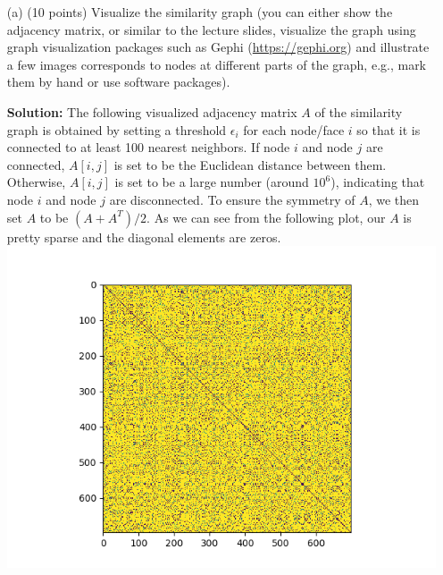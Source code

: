 \documentclass[twoside,12pt]{article}
\begin{document}
\begin{enumerate} 

\item[(a)] (10 points) Visualize the similarity graph (you can either show the adjacency matrix, or similar to the lecture slides, visualize the graph using graph visualization packages such as Gephi (\url{https://gephi.org}) and illustrate a few images corresponds to nodes at different parts of the graph, e.g., mark them by hand or use software packages).
\begin{tcolorbox}
\textbf{Solution:} The following visualized adjacency matrix $A$ of the similarity graph is obtained by setting a threshold $\epsilon_i$ for each node/face $i$ so that it is connected to at least 100 nearest neighbors. If node $i$ and node $j$ are connected, $A[i, j]$ is set to be the Euclidean distance between them. Otherwise, $A[i, j]$ is set to be a large number (around $10^6$), indicating that node $i$ and node $j$ are disconnected. To ensure the symmetry of $A$, we then set $A$ to be $(A + A^T)/2$. As we can see from the following plot, our $A$ is pretty sparse and the diagonal elements are zeros. \\
\includegraphics[width=.99\textwidth]{similarity_matrix.png}
\end{tcolorbox}
 

\end{enumerate}
\end{document}
